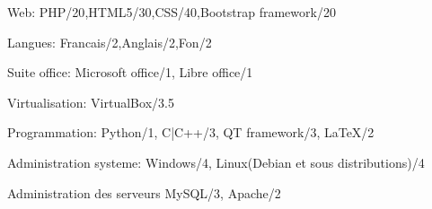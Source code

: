 


\begin{cvskills}


\cvskill
{Web:} %
{{PHP/20},{HTML5/30},{CSS/40},{Bootstrap framework/20}} %


\cvskill
{Langues:} %
{Francais/2,Anglais/2,Fon/2} %


\cvskill
{Suite office:} %
{Microsoft office/1, Libre office/1} %


\cvskill
{Virtualisation:} %
{VirtualBox/3.5} %


\cvskill
{Programmation:} %
{Python/1, C|C++/3, QT framework/3, LaTeX/2} %


\cvskill
{Administration systeme:} %
{Windows/4, Linux(Debian et sous distributions)/4} %


\cvskill
{Administration des serveurs} %
{MySQL/3, Apache/2} %


\end{cvskills}
